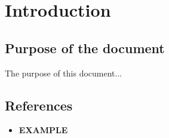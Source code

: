 \documentclass[ManualeUtente.tex]{subfiles}
\begin{document}
\chapter{Introduction}

	\section{Purpose of the document}
	The purpose of this document...
	
	\scopoProdottoEN
	
	\section{References}
		\begin{itemize}
			\item \textbf{EXAMPLE}\\
		\end{itemize}
\end{document}
